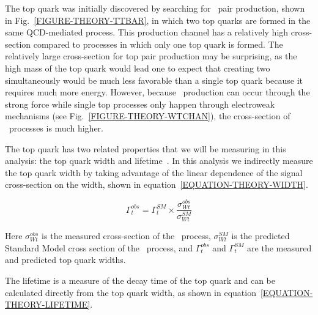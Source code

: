 The top quark was initially discovered by searching for \TTbar\ pair production, shown in Fig.~\ref{FIGURE-THEORY-TTBAR}, in which two top quarks are formed in the same QCD-mediated process. This production channel has a relatively high cross-section compared to processes in which only one top quark is formed. The relatively large cross-section for top pair production may be surprising, as the high mass of the top quark would lead one to expect that creating two simultaneously would be much less favorable than a single top quark because it requires much more energy. However, because \TTbar\ production can occur through the strong force while single top processes only happen through electroweak mechanisms (see Fig.~\ref{FIGURE-THEORY-WTCHAN}), the cross-section of \TTbar\ processes is much higher.

The top quark has two related properties that we will be measuring in this analysis: the top quark width and lifetime~\cite{D0TopWidth:2010}. In this analysis we indirectly measure the top quark width by taking advantage of the linear dependence of the signal cross-section on the width, shown in equation~\ref{EQUATION-THEORY-WIDTH}. 

\begin{equation}
\label{EQUATION-THEORY-WIDTH}
\Gamma_{t}^{obs} = \Gamma_{t}^{SM} \times \frac{\sigma^{obs}_{Wt}}{\sigma^{SM}_{Wt}}
\end{equation}

Here $\sigma^{obs}_{Wt}$ is the measured cross-section of the \Wtchan\ process, $\sigma^{SM}_{Wt}$ is the predicted Standard Model cross section of the \Wtchan\ process, and $\Gamma_{t}^{obs}$ and $\Gamma_{t}^{SM}$ are the measured and predicted top quark widths. 

The lifetime is a measure of the decay time of the top quark and can be calculated directly from the top quark width, as shown in equation~\ref{EQUATION-THEORY-LIFETIME}.


